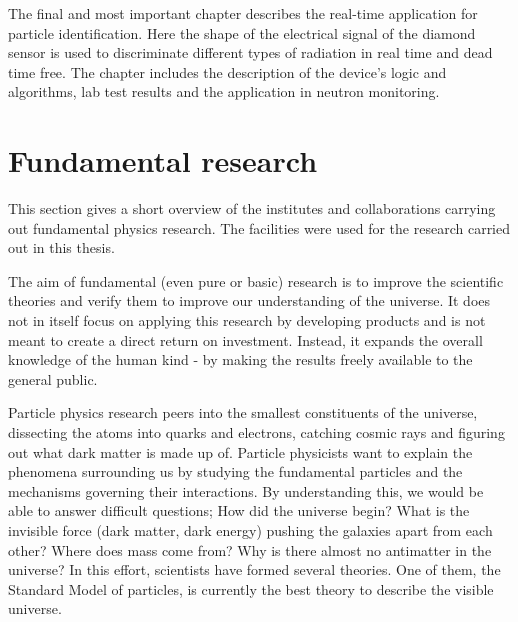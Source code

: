 \documentclass[twoside,12pt]{packages/mytustyle}  %
\begin{document}
The final and most important chapter describes the real-time application for particle identification. Here the shape of the electrical signal of the diamond sensor is used to discriminate different types of radiation in real time and dead time free. The chapter includes the description of the device's logic and algorithms, lab test results and the application in neutron monitoring.


 




\clearpage
\section{Fundamental research}
\label{sec:fundphy}
This section gives a short overview of the institutes and collaborations carrying out fundamental physics research. The facilities were used for the research carried out in this thesis. 

The aim of fundamental (even pure or basic) research is to improve the scientific theories and verify them to improve our understanding of the universe.  It does not in itself focus on applying this research by developing products and is not meant to create a direct return on investment. Instead, it expands the overall knowledge of the human kind - by making the results freely available to the general public.

Particle physics research peers into the smallest constituents of the universe, dissecting the atoms into quarks and electrons, catching cosmic rays and figuring out what dark matter is made up of. Particle physicists want to explain the phenomena surrounding us by studying the fundamental particles and the mechanisms governing their interactions. By understanding this, we would be able to answer difficult questions; How did the universe begin? What is the invisible force (dark matter, dark energy) pushing the galaxies apart from each other? Where does mass come from? Why is there almost no antimatter in the universe? In this effort, scientists have formed several theories. One of them, the Standard Model of particles, is currently the best theory to describe the visible universe.
\end{document}
